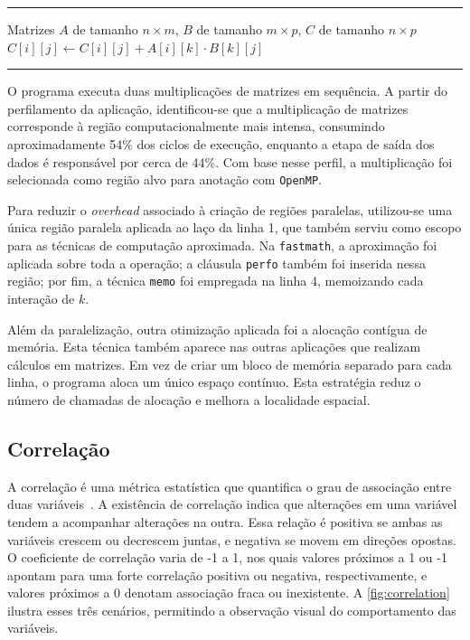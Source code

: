 \begin{sourcecode}[htb]
	\caption{Multiplicação de matrizes.}
	\label{alg:mul_matrix}
	\hrule
	\begin{algorithmic}[1]
		\REQUIRE Matrizes $A$ de tamanho $n \times m$, $B$ de tamanho $m \times p$, $C$ de tamanho $n \times p$
		\STATE $C[i][j] \gets C[i][j] + A[i][k] \cdot B[k][j]$
		\ENDFOR
		\ENDFOR
		\ENDFOR
	\end{algorithmic}
	\hrule
\end{sourcecode}

O programa executa duas multiplicações de matrizes em sequência. A partir do perfilamento da aplicação, identificou-se que a multiplicação de matrizes corresponde à região computacionalmente mais intensa, consumindo aproximadamente 54\% dos ciclos de execução, enquanto a etapa de saída dos dados é responsável por cerca de 44\%. Com base nesse perfil, a multiplicação foi selecionada como região alvo para anotação com \texttt{OpenMP}.

Para reduzir o \textit{overhead} associado à criação de regiões paralelas, utilizou-se uma única região paralela aplicada ao laço da linha 1, que também serviu como escopo para as técnicas de computação aproximada. Na \texttt{fastmath}, a aproximação foi aplicada sobre toda a operação; a cláusula \texttt{perfo} também foi inserida nessa região; por fim, a técnica \texttt{memo} foi empregada na linha 4, memoizando cada interação de $k$.

Além da paralelização, outra otimização aplicada foi a alocação contígua de memória. Esta técnica também aparece nas outras aplicações que realizam cálculos em matrizes. Em vez de criar um bloco de memória separado para cada linha, o programa aloca um único espaço contínuo. Esta estratégia reduz o número de chamadas de alocação e melhora a localidade espacial.

\subsection{Correlação}\label{subsec:correlation}

A correlação é uma métrica estatística que quantifica o grau de associação entre duas variáveis~\cite{morettin2010}. A existência de correlação indica que alterações em uma variável tendem a acompanhar alterações na outra. Essa relação é positiva se ambas as variáveis crescem ou decrescem juntas, e negativa se movem em direções opostas. O coeficiente de correlação varia de -1 a 1, nos quais valores próximos a 1 ou -1 apontam para uma forte correlação positiva ou negativa, respectivamente, e valores próximos a 0 denotam associação fraca ou inexistente. A \autoref{fig:correlation} ilustra esses três cenários, permitindo a observação visual do comportamento das variáveis.

